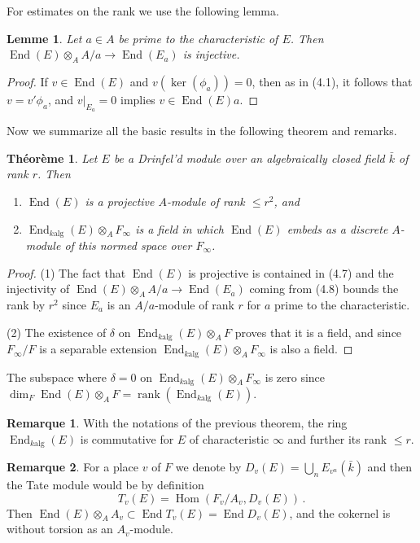 \documentclass[12pt,a4paper]{article}
\theoremstyle{plain}
\newtheorem{theorem}{Th\'eor\`eme}[section]
\newtheorem{lemma}{Lemme}[section]
\theoremstyle{definition}
\newtheorem{remark}{Remarque}[section]
\theoremstyle{remark}
\DeclareMathOperator{\End}{End}
\DeclareMathOperator{\Hom}{Hom}
\DeclareMathOperator{\rank}{rank}
\begin{document}
For estimates on the rank we use the following lemma.

\begin{lemma}
Let $a \in A$ be prime to the characteristic of $E$. Then 
$\End(E) \otimes_A A/a \to \End(E_a)$ is injective.
\end{lemma}

\begin{proof}
If $v \in \End(E)$ and $v(\ker(\phi_a)) = 0$, then as in (4.1), it follows that 
$v = v'\phi_a$, and $v|_{E_a} = 0$ implies $v \in \End(E)a$.
\end{proof}

Now we summarize all the basic results in the following theorem and remarks.

\begin{theorem}
Let $E$ be a Drinfel'd module over an algebraically closed field $\bar{k}$ of 
rank $r$. Then
\begin{enumerate}[label=(\arabic*)]
\item $\End(E)$ is a projective $A$-module of rank $\leqslant r^2$, and
\item $\End_{k\text{alg}}(E) \otimes_A F_\infty$ is a field in which $\End(E)$ 
embeds as a discrete $A$-module of this normed space over $F_\infty$.
\end{enumerate}
\end{theorem}

\begin{proof}
(1) The fact that $\End(E)$ is projective is contained in (4.7) and the 
injectivity of $\End(E) \otimes_A A/a \to \End(E_a)$ coming from (4.8) bounds 
the rank by $r^2$ since $E_a$ is an $A/a$-module of rank $r$ for $a$ prime 
to the characteristic.

(2) The existence of $\delta$ on $\End_{k\text{alg}}(E) \otimes_A F$ proves that 
it is a field, and since $F_\infty/F$ is a separable extension 
$\End_{k\text{alg}}(E) \otimes_A F_\infty$ is also a field.
\end{proof}

The subspace where $\delta = 0$ on $\End_{k\text{alg}}(E) \otimes_A F_\infty$ is 
zero since $\dim_F \End(E) \otimes_A F = \rank(\End_{k\text{alg}}(E))$.

\begin{remark}
With the notations of the previous theorem, the ring $\End_{k\text{alg}}(E)$ is 
commutative for $E$ of characteristic $\infty$ and further its rank 
$\leqslant r$.
\end{remark}

\begin{remark}
For a place $v$ of $F$ we denote by $D_v(E) = \bigcup_n E_{v^n}(\bar{k})$ and 
then the Tate module would be by definition
\[
T_v(E) = \Hom(F_v/A_v, D_v(E)) \,.
\]
Then $\End(E) \otimes_A A_v \subset \End T_v(E) = \End D_v(E)$, and the 
cokernel is without torsion as an $A_v$-module.
\end{remark}
\end{document}
